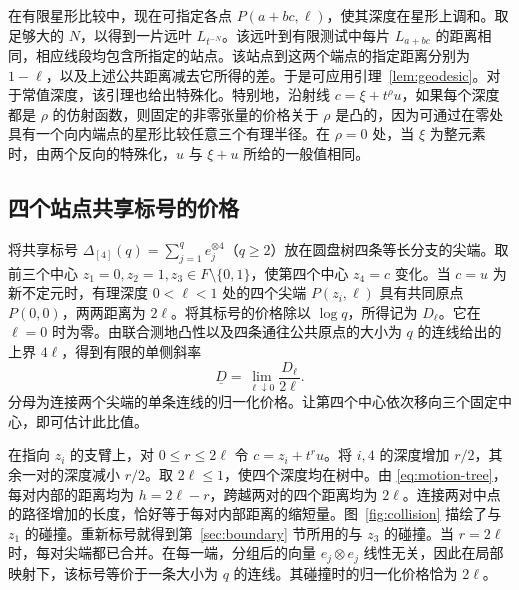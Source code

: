 在有限星形比较中，现在可指定各点 \(P(a+bc,\ell)\)，使其深度在星形上调和。取足够大的 \(N\)，以得到一片远叶 \(L_{t^{-N}}\)。该远叶到有限测试中每片 \(L_{a+bc}\) 的距离相同，相应线段均包含所指定的站点。该站点到这两个端点的指定距离分别为 \(1-\ell\)，以及上述公共距离减去它所得的差。于是可应用引理~\ref{lem:geodesic}。对于常值深度，该引理也给出特殊化。特别地，沿射线 \(c=\xi+t^\rho u\)，如果每个深度都是 \(\rho\) 的仿射函数，则固定的非零张量的价格关于 \(\rho\) 是凸的，因为可通过在零处具有一个向内端点的星形比较任意三个有理半径。在 \(\rho=0\) 处，当 \(\xi\) 为整元素时，由两个反向的特殊化，\(u\) 与 \(\xi+u\) 所给的一般值相同。

\subsection{四个站点共享标号的价格}

将共享标号 \(\Delta_{[4]}(q)=\sum_{j=1}^q e_j^{\otimes4}\)（\(q\ge2\)）放在圆盘树四条等长分支的尖端。取前三个中心 \(z_1=0,z_2=1,z_3\in F\setminus\{0,1\}\)，使第四个中心 \(z_4=c\) 变化。当 \(c=u\) 为新不定元时，有理深度 \(0<\ell<1\) 处的四个尖端 \(P(z_i,\ell)\) 具有共同原点 \(P(0,0)\)，两两距离为 \(2\ell\)。将其标号的价格除以 \(\log q\)，所得记为 \(D_\ell\)。它在 \(\ell=0\) 时为零。由联合测地凸性以及四条通往公共原点的大小为 \(q\) 的连线给出的上界 \(4\ell\)，得到有限的单侧斜率
\[
 \underline D=\lim_{\ell\downarrow0}\frac{D_\ell}{2\ell}.
\]
分母为连接两个尖端的单条连线的归一化价格。让第四个中心依次移向三个固定中心，即可估计此比值。

在指向 \(z_i\) 的支臂上，对 \(0\le r\le2\ell\) 令 \(c=z_i+t^r u\)。将 \(i,4\) 的深度增加 \(r/2\)，其余一对的深度减小 \(r/2\)。取 \(2\ell\le1\)，使四个深度均在树中。由 \eqref{eq:motion-tree}，每对内部的距离均为 \(h=2\ell-r\)，跨越两对的四个距离均为 \(2\ell\)。连接两对中点的路径增加的长度，恰好等于每对内部距离的缩短量。图~\ref{fig:collision} 描绘了与 \(z_1\) 的碰撞。重新标号就得到第~\ref{sec:boundary} 节所用的与 \(z_3\) 的碰撞。当 \(r=2\ell\) 时，每对尖端都已合并。在每一端，分组后的向量 \(e_j\otimes e_j\) 线性无关，因此在局部映射下，该标号等价于一条大小为 \(q\) 的连线。其碰撞时的归一化价格恰为 \(2\ell\)。

